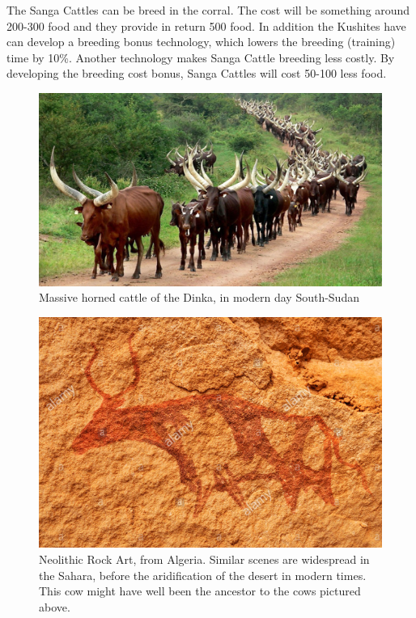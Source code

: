 \documentclass[a4paper,12pt]{scrreprt}
\begin{document}
The Sanga Cattles can be breed in the corral. The cost will be something around 200-300 food and they provide in return 500 food. In addition the Kushites have can develop a breeding bonus technology, which lowers the breeding (training) time by 10\%. Another technology makes Sanga Cattle breeding less costly. By developing the breeding cost bonus, Sanga Cattles will cost 50-100 less food.\\

\begin{figure}[H]
	\centering
	\includegraphics[width=\textwidth]{img/corral/herd_of_sanga_cattles}
	\caption{Massive horned cattle of the Dinka, in modern day South-Sudan}
\end{figure}

\begin{figure}[H]
	\centering
	\includegraphics[width=\textwidth]{img/corral/neolethic_rock_art_sanga_cattle}
	\caption{Neolithic Rock Art, from Algeria. Similar scenes are widespread in the Sahara, before the aridification of the desert in modern times. This cow might have well been the ancestor to the cows pictured above.}
\end{figure}
\end{document}
